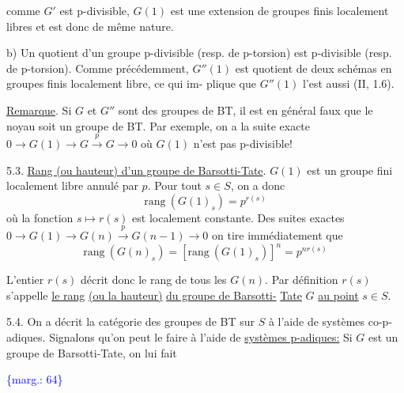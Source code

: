 \documentclass[11pt]{article}
\newcommand{\scanpage}[1]{\par\bigskip\noindent{\small\sffamily[scan #1]}\par}
\newcommand{\mspage}[1]{{\small\sffamily[p.\,#1]}}
\newcommand{\hand}[1]{\textcolor{blue}{#1}}
\newcommand{\margin}[1]{\textcolor{blue}{\{\textsf{marg.:} #1\}}}
\newcommand{\uline}[1]{\underline{#1}}
\begin{document}
\mspage{\hand{63}}

\clearpage
\scanpage{129/64}
\mspage{\hand{III-9}}

comme $G'$ est p-divisible, $G(1)$ est une extension de groupes finis
localement libres et est donc de même nature.

b) Un quotient d'un groupe p-divisible (resp. de p-torsion) est
p-divisible (resp. de p-torsion). Comme précédemment, $G''(1)$ est
quotient de deux schémas en groupes finis localement libre, ce qui im-%
plique que $G''(1)$ l'est aussi (II, 1.6).

\uline{Remarque}. Si $G$ et $G''$ sont des groupes de BT, il est en général
faux que le noyau soit un groupe de BT. Par exemple, on a la suite
exacte $0 \to G(1) \to G \xrightarrow{p} G \to 0$ où $G(1)$ n'est pas p-divisible!

5.3. \uline{Rang (ou hauteur) d'un groupe de Barsotti-Tate}. $G(1)$ est un
groupe fini localement libre annulé par $p$. Pour tout $s \in S$, on a
donc
\[ \mathrm{rang}\ (G(1)_{s}) = p^{r(s)} \]
où la fonction $s \mapsto r(s)$ est localement constante. Des suites exactes
$0 \to G(1) \to G(n) \xrightarrow{p} G(n-1) \to 0$ on tire immédiatement que
\[ \mathrm{rang}\ (G(n)_{s}) = [\mathrm{rang}\ (G(1)_{s})]^{n} = p^{nr(s)} \]

L'entier $r(s)$ décrit donc le rang de tous les $G(n)$. Par
définition $r(s)$ s'appelle \uline{le rang} \uline{(ou la hauteur)} \uline{du groupe de Barsotti-}
\uline{Tate} $G$ \uline{au point} $s \in S$.

5.4. On a décrit la catégorie des groupes de BT sur $S$ à l'aide
de systèmes co-p-adiques. Signalons qu'on peut le faire à l'aide de
\uline{systèmes p-adiques:} Si $G$ est un groupe de Barsotti-Tate, on lui fait

\margin{64}

\clearpage
\scanpage{129/65}
\mspage{\hand{III-10}}
\end{document}
